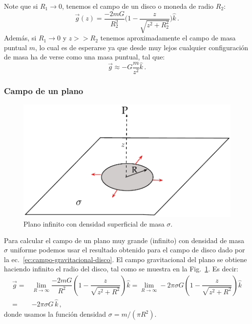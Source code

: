 %
Note que si $R_1 \rightarrow 0$, tenemos el campo de un disco o moneda de radio $R_2$:
%
\begin{equation}
\vec{g}(z)=\dfrac{-2mG}{R_2^2} \Bigg(1 - \dfrac{z}{\sqrt{z^2+R_2^2} }  \Bigg)\hat{k}\,.
\label{ec:campo-gravitacional-disco}
\end{equation}
Además, si $R_1 \rightarrow 0$ y $z >> R_2$ tenemos aproximadamente el campo de masa puntual $m$, lo cual es de esperarse ya que desde muy lejos cualquier configuración de masa ha de verse como una masa puntual, tal que:
%
\begin{equation}
\vec{g} \approx -G\dfrac{m}{z^2}\hat{k}\,.
\end{equation}  


\subsubsection{Campo de un plano}
%
\begin{figure}[h]
\begin{center}
\includegraphics[scale=0.6]{gravitacion/plano}
\end{center}
\caption{Plano infinito con densidad superficial de masa $\sigma$.}
\label{fig:gravitacion-plano}
\end{figure}
%
Para calcular el campo de un plano muy grande (infinito) con densidad de masa $\sigma$ uniforme podemos usar el resultado obtenido para el campo de disco dado por la ec.~\ref{ec:campo-gravitacional-disco}. El campo gravitacional del plano se obtiene haciendo infinito el radio del disco, tal como se muestra en la Fig.~\ref{fig:gravitacion-plano}. Es decir:
\begin{align}
\vec{g}=& \lim_{R\to\infty}\dfrac{-2mG}{R^2} \left(1 - \dfrac{z}{\sqrt{z^2+R^2} }  \right)\hat{k} 
= \lim_{R\to\infty}-2\pi\sigma G \left(1 - \dfrac{z}{\sqrt{z^2+R^2} }  \right)\hat{k}\nonumber\\
=& -2\pi\sigma G\, \hat{k}\,,
\label{ec:campo-gravitacional-plano}
\end{align}
donde usamos la función densidad $\sigma=m/(\pi R^2)$.




